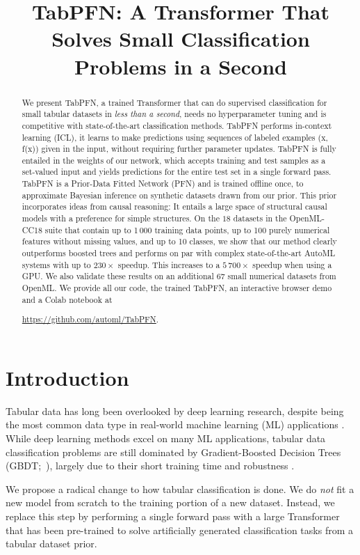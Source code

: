 \title{TabPFN: A Transformer That Solves Small Classification Problems in a Second}

\begin{abstract}
We present TabPFN, a trained Transformer that can do supervised classification for small tabular datasets in \textit{less than a second}, needs no hyperparameter tuning and is competitive with state-of-the-art classification methods. TabPFN performs in-context learning (ICL), it learns to make predictions using sequences of labeled examples (x, f(x)) given in the input, without requiring further parameter updates. TabPFN is fully entailed in the weights of our network, which accepts training and test samples as a set-valued input and yields predictions for the entire test set in a single forward pass. TabPFN is a Prior-Data Fitted Network (PFN) and is trained offline once, to approximate Bayesian inference on synthetic datasets drawn from our prior. This prior incorporates ideas from causal reasoning: It entails a large space of structural causal models with a preference for simple structures. On the $18$ datasets in the OpenML-CC18 suite that contain up to 1\,000 training data points, up to 100 purely numerical features without missing values, and up to 10 classes, we show that our method clearly outperforms boosted trees and performs on par with complex state-of-the-art AutoML systems with up to $230\times$ speedup. This increases to a $5\,700\times$ speedup when using a GPU. We also validate these results on an additional 67 small numerical datasets from OpenML. We provide all our code, the trained TabPFN, an interactive browser demo and a Colab notebook at

\url{https://github.com/automl/TabPFN}.
\end{abstract}

\section{Introduction}
\label{sec:introduction}

Tabular data has long been overlooked by deep learning research, despite being the most common data type in real-world machine learning (ML) applications \citep{chui-mckinsey18a}. While deep learning methods excel on many ML applications, tabular data classification problems are still dominated by Gradient-Boosted Decision Trees (GBDT;~\citealp{friedman-as01a}), largely due to their short training time and robustness \citep{nnsfortabular2}.

We propose a radical change to how tabular classification is done. We do \emph{not} fit a new model from scratch to the training portion of a new dataset. Instead, we replace this step by performing a single forward pass with a large Transformer that has been pre-trained to solve artificially generated classification tasks from a tabular dataset prior.

